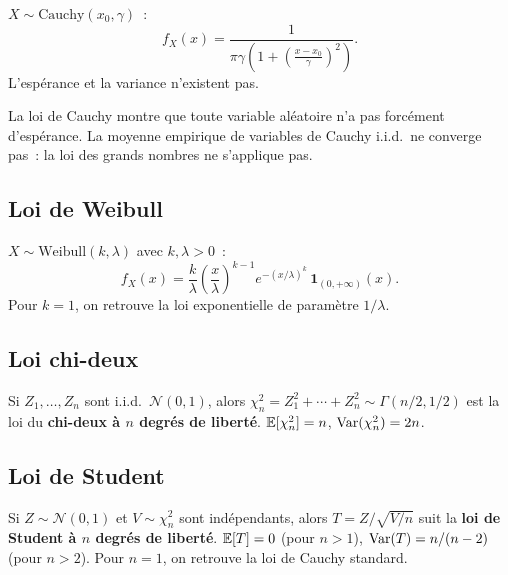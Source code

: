 \begin{definition}[Cauchy]
$X \sim \text{Cauchy}(x_0, \gamma)$~:
\[
    f_X(x) = \frac{1}{\pi\gamma\left(1 + \left(\frac{x-x_0}{\gamma}\right)^2\right)}.
\]
L'esp\'erance et la variance n'existent pas.
\end{definition}

\begin{attention}[title=\textbf{Cauchy n'a pas de moments}]
La loi de Cauchy montre que toute variable al\'eatoire n'a pas forc\'ement
d'esp\'erance. La moyenne empirique de variables de Cauchy i.i.d.\ ne converge
pas~: la loi des grands nombres ne s'applique pas.
\end{attention}

\subsection{Loi de Weibull}

\begin{definition}[Weibull]
$X \sim \text{Weibull}(k, \lambda)$ avec $k, \lambda > 0$~:
\[
    f_X(x) = \frac{k}{\lambda}\left(\frac{x}{\lambda}\right)^{k-1}
    e^{-(x/\lambda)^k}\, \mathbf{1}_{(0,+\infty)}(x).
\]
Pour $k = 1$, on retrouve la loi exponentielle de param\`etre $1/\lambda$.
\end{definition}

\subsection{Loi chi-deux}

\begin{definition}
Si $Z_1, \ldots, Z_n$ sont i.i.d.\ $\mathcal{N}(0,1)$, alors
$\chi^2_n = Z_1^2 + \cdots + Z_n^2 \sim \Gamma(n/2, 1/2)$ est la loi du
\textbf{chi-deux \`a $n$ degr\'es de libert\'e}. $\mathbb{E}[\chi^2_n] = n$,
$\mathrm{Var}(\chi^2_n) = 2n$.
\end{definition}

\subsection{Loi de Student}

\begin{definition}[Student]
Si $Z \sim \mathcal{N}(0,1)$ et $V \sim \chi^2_n$ sont ind\'ependants, alors
$T = Z/\sqrt{V/n}$ suit la \textbf{loi de Student \`a $n$ degr\'es de libert\'e}.
$\mathbb{E}[T] = 0$ (pour $n > 1$), $\mathrm{Var}(T) = n/(n-2)$ (pour $n > 2$).
Pour $n = 1$, on retrouve la loi de Cauchy standard.
\end{definition}

